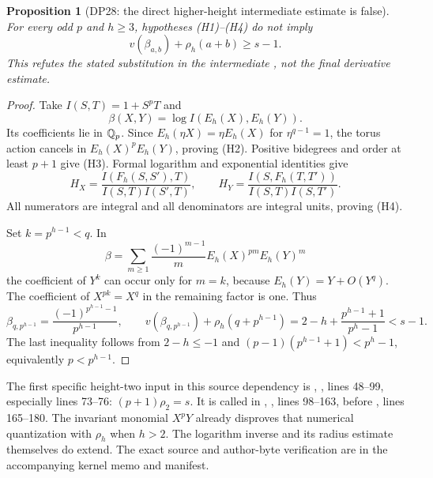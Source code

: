 \documentclass[11pt,a4paper]{article}
\newtheorem{proposition}[theorem]{Proposition}
\theoremstyle{definition}\newtheorem{remark}[theorem]{Remark}
\begin{document}
\begin{proposition}[DP28: the direct higher-height intermediate estimate is false]\label{DP28}
For every odd $p$ and $h\ge3$, hypotheses (H1)--(H4) do not imply
\[
 v(\beta_{a,b})+\rho_h(a+b)\ge s-1.
\]
This refutes the stated substitution in the intermediate , not the final derivative estimate.
\end{proposition}
\begin{proof}
Take $I(S,T)=1+S^pT$ and
\[
 \beta(X,Y)=\log I(E_h(X),E_h(Y)).
\]
Its coefficients lie in $\mathbb Q_p$. Since $E_h(\eta X)=\eta E_h(X)$ for $\eta^{q-1}=1$, the torus action cancels in $E_h(X)^pE_h(Y)$, proving (H2). Positive bidegrees and order at least $p+1$ give (H3). Formal logarithm and exponential identities give
\[
 H_X=\frac{I(F_h(S,S'),T)}{I(S,T)I(S',T)},\qquad
 H_Y=\frac{I(S,F_h(T,T'))}{I(S,T)I(S,T')}.
\]
All numerators are integral and all denominators are integral units, proving (H4).

Set $k=p^{h-1}<q$. In
\[
 \beta=\sum_{m\ge1}\frac{(-1)^{m-1}}m E_h(X)^{pm}E_h(Y)^m
\]
the coefficient of $Y^k$ can occur only for $m=k$, because $E_h(Y)=Y+O(Y^q)$. The coefficient of $X^{pk}=X^q$ in the remaining factor is one. Thus
\[
 \beta_{q,p^{h-1}}=\frac{(-1)^{p^{h-1}-1}}{p^{h-1}},\qquad
 v(\beta_{q,p^{h-1}})+\rho_h(q+p^{h-1})
 =2-h+\frac{p^{h-1}+1}{p^h-1}<s-1.
\]
The last inequality follows from $2-h\le-1$ and $(p-1)(p^{h-1}+1)<p^h-1$, equivalently $p<p^{h-1}$.
\end{proof}

The first specific height-two input in this source dependency is , , lines 48--99, especially lines 73--76: $(p+1)\rho_2=s$. It is called in , , lines 98--163, before , lines 165--180. The invariant monomial $X^pY$ already disproves that numerical quantization with $\rho_h$ when $h>2$. The logarithm inverse and its radius estimate themselves do extend. The exact source and author-byte verification are in the accompanying kernel memo and manifest.
\end{document}
